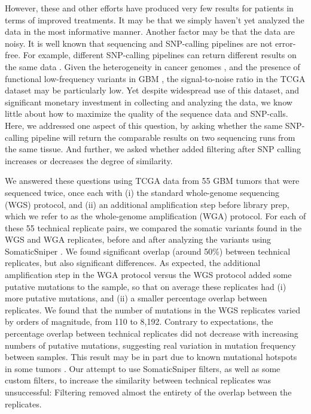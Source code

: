 \documentclass[11pt]{article} %
\begin{document}
However, these and other efforts have produced very few results for patients in terms of improved treatments. It may be that we simply haven't yet analyzed the data in the most informative manner. Another factor may be that the data are noisy. It is well known that sequencing and SNP-calling pipelines are not error-free. For example, different SNP-calling pipelines can return different results on the same data \citep{SNPcall}. Given the heterogeneity in cancer genomes \citep{heterogenous1, heterogenous2}, and the presence of functional low-frequency variants in GBM \citep{rare}, the signal-to-noise ratio in the TCGA dataset may be particularly low. Yet despite widespread use of this dataset, and significant monetary investment in collecting and analyzing the data, we know little about how to maximize the quality of the sequence data and SNP-calls. Here, we addressed one aspect of this question, by asking whether the same SNP-calling pipeline will return the comparable results on two sequencing runs from the same tissue. And further, we asked whether added filtering after SNP calling increases or decreases the degree of similarity.

We answered these questions using TCGA data from 55 GBM tumors that were sequenced twice, once each with (i) the standard whole-genome sequencing (WGS) protocol, and (ii) an additional amplification step before library prep, which we refer to as the whole-genome amplification (WGA) protocol. For each of these 55 technical replicate pairs, we compared the somatic variants found in the WGS and WGA replicates, before and after analyzing the variants using SomaticSniper \citep{SomaticSniper}. We found significant overlap (around 50\%) between technical replicates, but also significant differences. As expected, the additional amplification step in the WGA protocol versus the WGS protocol added some putative mutations to the sample, so that on average these replicates had (i) more putative mutations, and (ii) a smaller percentage overlap between replicates. We found that the number of mutations in the WGS replicates varied by orders of magnitude, from 110 to 8,192. Contrary to expectations, the percentage overlap between technical replicates did not decrease with increasing numbers of putative mutations, suggesting real variation in mutation frequency between samples. This result may be in part due to known mutational hotspots in some tumors \citep{Karen}. Our attempt to use SomaticSniper filters, as well as some custom filters, to increase the similarity between technical replicates was unsuccessful: Filtering removed almost the entirety of the overlap between the replicates.
\end{document}
